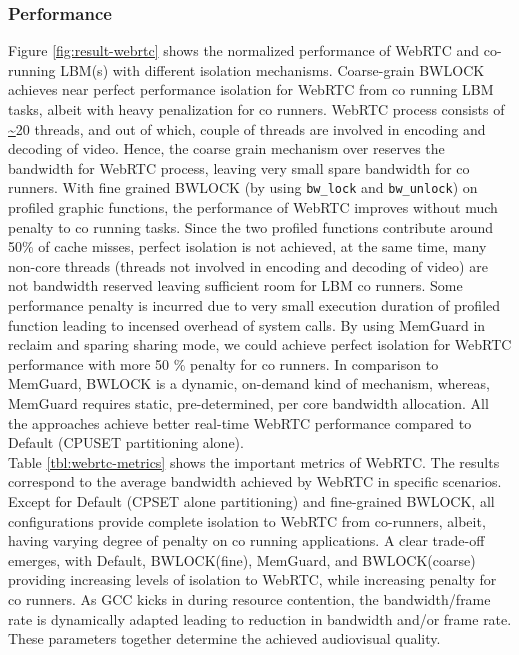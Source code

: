 \documentclass[times, 10pt,onecolumn]{article}
\begin{document}
\subsubsection{Performance}
Figure \ref{fig:result-webrtc} shows the normalized performance of
WebRTC and co-running LBM(s) with different isolation mechanisms.
Coarse-grain BWLOCK achieves near perfect performance isolation for
WebRTC from co running LBM tasks, albeit with heavy penalization for
co runners. WebRTC process consists of \url{~}20 threads, and out of which,
couple of threads are involved in encoding and decoding of
video. Hence, the coarse grain mechanism over reserves the bandwidth
for WebRTC process, leaving very small spare bandwidth for co
runners. With fine grained BWLOCK (by using \texttt{bw\_lock} and
\texttt{bw\_unlock}) on profiled graphic functions, the performance of
WebRTC improves without much penalty to co running tasks. Since the
two profiled functions contribute around 50\% of cache misses, perfect
isolation is not achieved, at the same time, many non-core threads
(threads not involved in encoding and decoding of video) are not
bandwidth reserved leaving sufficient room for LBM co runners. Some
performance penalty is incurred due to very small execution duration
of profiled function leading to incensed overhead of system calls. By
using MemGuard in reclaim and sparing sharing mode, we could achieve
perfect isolation for WebRTC performance with more 50 \% penalty for
co runners. In comparison to MemGuard, BWLOCK is a dynamic, on-demand
kind of mechanism, whereas, MemGuard requires static, pre-determined,
per core bandwidth allocation. All the approaches achieve better
real-time WebRTC performance compared to Default (CPUSET partitioning
alone).\\
Table \ref{tbl:webrtc-metrics} shows the important metrics of
WebRTC. The results correspond to the average bandwidth achieved by
WebRTC in specific scenarios. Except for Default (CPSET alone
partitioning) and fine-grained BWLOCK, all configurations provide
complete isolation to WebRTC from co-runners, albeit, having varying
degree of penalty on co running applications. A clear trade-off
emerges, with Default, BWLOCK(fine), MemGuard, and BWLOCK(coarse)
providing increasing levels of isolation to WebRTC, while increasing
penalty for co runners. As GCC kicks in during resource contention,
the bandwidth/frame rate is dynamically adapted leading to reduction
in bandwidth and/or frame rate. These parameters together determine
the achieved audiovisual quality.
\end{document}
